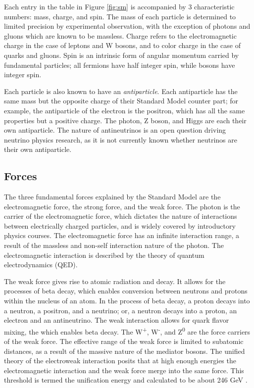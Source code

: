 Each entry in the table in Figure \ref{fig:sm} is accompanied by 3 characteristic numbers: mass, charge, and spin. The mass of each particle is determined to limited precision by experimental observation, with the exception of photons and gluons which are known to be massless. Charge refers to the electromagnetic charge in the case of leptons and W bosons, and to color charge in the case of quarks and gluons. Spin is an intrinsic form of angular momentum carried by fundamental particles; all fermions have half integer spin, while bosons have integer spin. \par

Each particle is also known to have an \textit{antiparticle}. Each antiparticle has the same mass but the opposite charge of their Standard Model counter part; for example, the antiparticle of the electron is the positron, which has all the same properties but a positive charge. The photon, Z boson, and Higgs are each their own antiparticle. The nature of antineutrinos is an open question driving neutrino physics research, as it is not currently known whether neutrinos are their own antiparticle. \par

\subsection{Forces}
The three fundamental forces explained by the Standard Model are the electromagnetic force, the strong force, and the weak force. The photon is the carrier of the electromagnetic force, which dictates the nature of interactions between electrically charged particles, and is widely covered by introductory physics courses. The electromagnetic force has an infinite interaction range, a result of the massless and non-self interaction nature of the photon. The electromagnetic interaction is described by the theory of quantum electrodynamics (QED).\par

The weak force gives rise to atomic radiation and decay. It allows for the processes of beta decay, which enables conversion between neutrons and protons within the nucleus of an atom. In the process of beta decay, a proton decays into a neutron, a positron, and a neutrino; or, a neutron decays into a proton, an electron and an antineutrino. The weak interaction allows for quark flavor mixing, the which enables beta decay. The W\textsuperscript{+}, W\textsuperscript{-}, and Z\textsuperscript{0} are the force carriers of the weak force. The effective range of the weak force is limited to subatomic distances, as a result of the massive nature of the mediator bosons. The unified theory of the electroweak interaction posits that at high enough energies the electromagnetic interaction and the weak force merge into the same force. This threshold is termed the unification energy and calculated to be about 246 GeV \cite{vev}. \par

